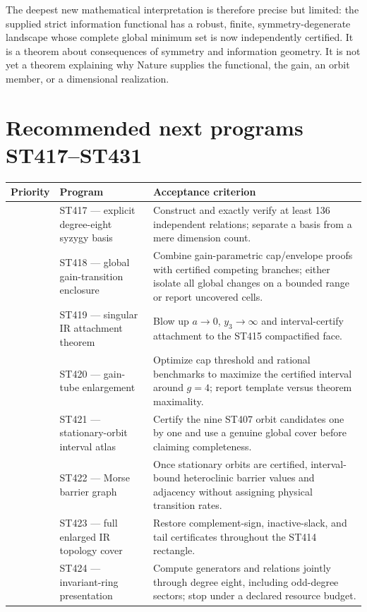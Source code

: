 \documentclass[11pt,a4paper]{article}
\begin{document}
The deepest new mathematical interpretation is therefore precise but limited:
the supplied strict information functional has a robust, finite, symmetry-degenerate
landscape whose complete global minimum set is now independently certified.  It is
a theorem about consequences of symmetry and information geometry.  It is not yet
a theorem explaining why Nature supplies the functional, the gain, an orbit member,
or a dimensional realization.

\section{Recommended next programs ST417--ST431}

\begin{longtable}{>{\raggedright\arraybackslash}p{}>{\raggedright\arraybackslash}p{}>{\raggedright\arraybackslash}p{}}
\toprule Priority&Program&Acceptance criterion\\\midrule\endhead
1&ST417 --- explicit degree-eight syzygy basis&Construct and exactly verify at least 136 independent relations; separate a basis from a mere dimension count.\\
1&ST418 --- global gain-transition enclosure&Combine gain-parametric cap/envelope proofs with certified competing branches; either isolate all global changes on a bounded range or report uncovered cells.\\
1&ST419 --- singular IR attachment theorem&Blow up $a\to0$, $y_3\to\infty$ and interval-certify attachment to the ST415 compactified face.\\
2&ST420 --- gain-tube enlargement&Optimize cap threshold and rational benchmarks to maximize the certified interval around $g=4$; report template versus theorem maximality.\\
2&ST421 --- stationary-orbit interval atlas&Certify the nine ST407 orbit candidates one by one and use a genuine global cover before claiming completeness.\\
2&ST422 --- Morse barrier graph&Once stationary orbits are certified, interval-bound heteroclinic barrier values and adjacency without assigning physical transition rates.\\
2&ST423 --- full enlarged IR topology cover&Restore complement-sign, inactive-slack, and tail certificates throughout the ST414 rectangle.\\
3&ST424 --- invariant-ring presentation&Compute generators and relations jointly through degree eight, including odd-degree sectors; stop under a declared resource budget.\\

\end{longtable}
\end{document}
